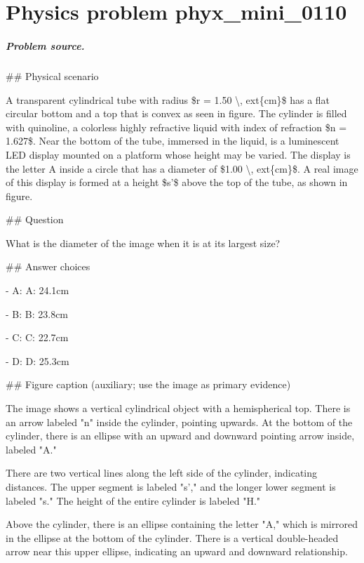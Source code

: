 
\chapter{Physics problem phyx\_mini\_0110}
\label{ch:PhyXMiniProblems_problem_phyx_mini_0110}

\paragraph{Problem source.}
\#\# Physical scenario

A transparent cylindrical tube with radius \$r = 1.50 \textbackslash{}, 	ext\{cm\}\$ has a flat circular bottom and a top that is convex as seen in figure. The cylinder is filled with quinoline, a colorless highly refractive liquid with index of refraction \$n = 1.627\$. Near the bottom of the tube, immersed in the liquid, is a luminescent LED display mounted on a platform whose height may be varied. The display is the letter A inside a circle that has a diameter of \$1.00 \textbackslash{}, 	ext\{cm\}\$. A real image of this display is formed at a height \$s'\$ above the top of the tube, as shown in figure.

\#\# Question

What is the diameter of the image when it is at its largest size?

\#\# Answer choices

- A: A: 24.1cm

- B: B: 23.8cm

- C: C: 22.7cm

- D: D: 25.3cm

\#\# Figure caption (auxiliary; use the image as primary evidence)

The image shows a vertical cylindrical object with a hemispherical top. There is an arrow labeled "n" inside the cylinder, pointing upwards. At the bottom of the cylinder, there is an ellipse with an upward and downward pointing arrow inside, labeled "A."

There are two vertical lines along the left side of the cylinder, indicating distances. The upper segment is labeled "s'," and the longer lower segment is labeled "s." The height of the entire cylinder is labeled "H."

Above the cylinder, there is an ellipse containing the letter "A," which is mirrored in the ellipse at the bottom of the cylinder. There is a vertical double-headed arrow near this upper ellipse, indicating an upward and downward relationship.

